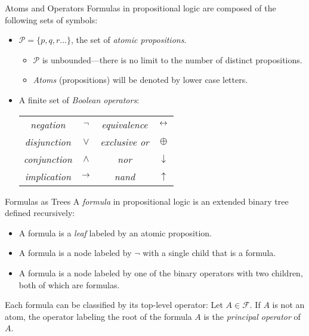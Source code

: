 \documentclass[style=sailor,size=12pt]{powerdot}
\theoremstyle{definition}
\newenvironment{defn}[1]
  {\renewcommand\theinnerdefn{#1}\innerdefn}
  {\endinnerdefn}
\begin{document}
\begin{wideslide}[bm=,toc=]{Atoms and Operators}
\begin{defn}{2.1}[Ben Ari]
Formulas in propositional logic are composed of the following sets of symbols:
\begin{itemize}
\item $\mathcal{P} = \{p,q,r...\}$, the set of \emph{atomic propositions}.
\begin{itemize}
\item $\mathcal{P}$ is unbounded---there is no limit to the number of distinct
propositions.
\item \emph{Atoms} (propositions) will be denoted by lower case letters.
\end{itemize}
\item A finite set of \emph{Boolean operators}:
\begin{center}
\begin{tabular}{|c c||c c|}
\hline
\emph{negation}     & $\mathop{\neg}$  & \emph{equivalence}  & $\mathbin{\leftrightarrow}$  \\
\emph{disjunction}  & $\lor$  & \emph{exclusive or} & $\oplus$  \\
\emph{conjunction}  & $\land$ & \emph{nor}          & $\downarrow$  \\
\emph{implication}  & $\mathbin{\rightarrow}$   & \emph{nand}         & $\uparrow$  \\
\hline
\end{tabular}
\end{center}

\end{itemize}
\end{defn}
\end{wideslide}

\begin{wideslide}[bm=,toc=]{Formulas as Trees}
\begin{defn}{2.2}[Ben Ari]
A \emph{formula} in propositional logic is an extended binary tree defined recursively:
\begin{itemize}
\item A formula is a \emph{leaf} labeled by an atomic proposition.
\item A formula is a node labeled by $\neg$ with a single child that is a
formula.
\item A formula is a node labeled by one of the binary operators with two
children, both of which are formulas. 
\end{itemize}
\end{defn}
Each formula can be classified by its top-level operator:
\begin{defn}{2.10}[Ben Ari]
Let $A \in \mathcal{F}$. If $A$ is not an atom, the operator labeling
the root of the formula $A$ is the \emph{principal operator} of $A$.
\end{defn}

\end{wideslide}
\end{document}

